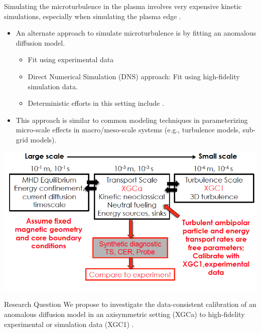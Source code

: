 \documentclass[11pt]{beamer}
\begin{document}
\begin{frame}
	
Simulating the microturbulence in the plasma involves very expensive kinetic simulations, 
especially when simulating the plasma edge \footnotemark[1]. 

\begin{itemize}
	\item An alternate approach to simulate microturbulence is by fitting an anomalous diffusion model.
	\begin{itemize} 
	\item Fit using  experimental data
 	\item Direct Numerical Simulation (DNS) approach: Fit using high-fidelity simulation data.
 	\item Deterministic efforts in this setting include \footnotemark[2]. 
\end{itemize}
\item This approach is similar to common modeling techniques in  parameterizing micro-scale
effects in macro/meso-scale systems (e.g., turbulence models, sub-grid models). 

 \end{itemize}
 


\end{frame}
 
 \begin{frame}
 
 \centerline{ \includegraphics[height=.6\textheight]{xgca_calibrate.png}}
 
 \begin{block}{Research Question}
 We propose to investigate the data-consistent calibration of an anomalous diffusion model in an axisymmetric setting (XGCa) to high-fidelity experimental or simulation data (XGC1) \footnotemark[1].
\end{block}
	

\end{frame}
\end{document}
